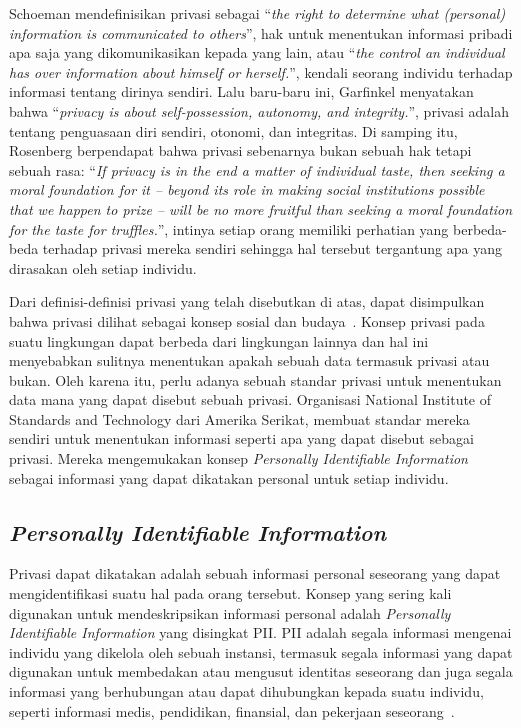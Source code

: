 Schoeman mendefinisikan privasi sebagai “\textit{the right to determine what (personal) information is communicated to others}”, hak untuk menentukan informasi pribadi apa saja yang dikomunikasikan kepada yang lain, atau “\textit{the control an individual has over information about himself or herself.}”, kendali seorang individu terhadap informasi tentang dirinya sendiri. Lalu baru-baru ini, Garfinkel menyatakan bahwa “\textit{privacy is about self-possession, autonomy, and integrity.}”, privasi adalah tentang penguasaan diri sendiri, otonomi, dan integritas. Di samping itu, Rosenberg berpendapat bahwa privasi sebenarnya bukan sebuah hak tetapi sebuah rasa: “\textit{If privacy is in the end a matter of individual taste, then seeking a moral foundation for it -- beyond its role in making social institutions possible that we happen to prize -- will be no more fruitful than seeking a moral foundation for the taste for truffles.}”, intinya setiap orang memiliki perhatian yang berbeda-beda terhadap privasi mereka sendiri sehingga hal tersebut tergantung apa yang dirasakan oleh setiap individu.

Dari definisi-definisi privasi yang telah disebutkan di atas, dapat disimpulkan bahwa privasi dilihat sebagai konsep sosial dan budaya~\cite{stanleyosmar:04:standardppdm}. Konsep privasi pada suatu lingkungan dapat berbeda dari lingkungan lainnya dan hal ini menyebabkan sulitnya menentukan apakah sebuah data termasuk privasi atau bukan. Oleh karena itu, perlu adanya sebuah standar privasi untuk menentukan data mana yang dapat disebut sebuah privasi. Organisasi National Institute of Standards and Technology dari Amerika Serikat, membuat standar mereka sendiri untuk menentukan informasi seperti apa yang dapat disebut sebagai privasi. Mereka mengemukakan konsep \textit{Personally Identifiable Information} sebagai informasi yang dapat dikatakan personal untuk setiap individu.

\subsection{\textit{Personally Identifiable Information}}
\label{subsec:pii}

Privasi dapat dikatakan adalah sebuah informasi personal seseorang yang dapat mengidentifikasi suatu hal pada orang tersebut. Konsep yang sering kali digunakan untuk mendeskripsikan informasi personal adalah \textit{Personally Identifiable Information} yang disingkat PII. PII adalah segala informasi mengenai individu yang dikelola oleh sebuah instansi, termasuk segala informasi yang dapat digunakan untuk membedakan atau mengusut identitas seseorang dan juga segala informasi yang berhubungan atau dapat dihubungkan kepada suatu individu, seperti informasi medis, pendidikan, finansial, dan pekerjaan seseorang~\cite{nist:08:pii}. 

